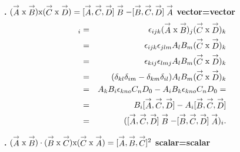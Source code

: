 \vspace{.1in}
{\bf {}.} $(\stackrel{\rightarrow}{A} \textup{x} \stackrel{\rightarrow}{B})\textup{x} (\stackrel{\rightarrow}{C} \textup{x} \stackrel{\rightarrow}{D})= [\stackrel{\rightarrow}{A} , \stackrel{\rightarrow}{C} , \stackrel{\rightarrow}{D}] \stackrel{\rightarrow}{B} -
[\stackrel{\rightarrow}{B} , \stackrel{\rightarrow}{C} , \stackrel{\rightarrow}{D}] \stackrel{\rightarrow}{A}$
{\flushleft \bf vector=vector}
\begin{eqnarray*}
[(\stackrel{\rightarrow}{A} \textup{x} \stackrel{\rightarrow}{B})\textup{x} (\stackrel{\rightarrow}{C} \textup{x} \stackrel{\rightarrow}{D})]_i&=&
\epsilon_{ijk}(\stackrel{\rightarrow}{A} \textup{x} \stackrel{\rightarrow}{B})_j (\stackrel{\rightarrow}{C} \textup{x} \stackrel{\rightarrow}{D})_k\\
&=&\epsilon_{ijk}\epsilon_{jlm}A_lB_m (\stackrel{\rightarrow}{C} \textup{x} \stackrel{\rightarrow}{D})_k\\
&=&\epsilon_{kij}\epsilon_{lmj}A_lB_m (\stackrel{\rightarrow}{C} \textup{x} \stackrel{\rightarrow}{D})_k\\
&=&(\delta_{kl}\delta_{im}-\delta_{km}\delta_{il})A_lB_m (\stackrel{\rightarrow}{C} \textup{x} \stackrel{\rightarrow}{D})_k \\
&=&A_kB_i\epsilon_{kno}C_nD_0 - A_iB_k\epsilon_{kno}C_nD_0=\\
&=&B_i[\stackrel{\rightarrow}{A} , \stackrel{\rightarrow}{C} , \stackrel{\rightarrow}{D}]-A_i[\stackrel{\rightarrow}{B} , \stackrel{\rightarrow}{C} , \stackrel{\rightarrow}{D}]\\
&=&([\stackrel{\rightarrow}{A} , \stackrel{\rightarrow}{C} , \stackrel{\rightarrow}{D}] \stackrel{\rightarrow}{B} -
[\stackrel{\rightarrow}{B} , \stackrel{\rightarrow}{C} , \stackrel{\rightarrow}{D}] \stackrel{\rightarrow}{A})_i.
\end{eqnarray*}

\vspace{.1in}

{\bf {}.} $(\stackrel{\rightarrow}{A} \textup{x} \stackrel{\rightarrow}{B})\cdot (\stackrel{\rightarrow}{B} \textup{x} \stackrel{\rightarrow}{C}) \textup{x} (\stackrel{\rightarrow}{C} \textup{x} \stackrel{\rightarrow}{A})= [\stackrel{\rightarrow}{A} , \stackrel{\rightarrow}{B} , \stackrel{\rightarrow}{C}] ^2$
{\flushleft \bf scalar=scalar}



